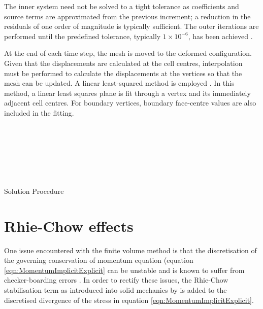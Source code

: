 \documentclass[sn-mathphys,Numbered,draft]{sn-jnl}%
\begin{document}
The inner system need not be solved to a tight tolerance
as coefficients and source terms are approximated from the previous increment; a reduction in the residuals of one order of magnitude is typically sufficient. The outer iterations are performed until the predefined tolerance, typically $1 \times 10^{-6}$, has been achieved \cite{cardiff_lagrangian_2017}. 

At the end of each time step, the mesh is moved to the deformed configuration. Given that the displacements are calculated at the cell centres, interpolation must be performed to calculate the displacements at the vertices so that the mesh can be updated. A linear least-squared method is employed \cite{cavalcante_generalized_2012}. In this method, a linear least squares plane is fit through a vertex and its immediately adjacent cell centres. For boundary vertices, boundary face-centre values are also included in the fitting.

 
\begin{algorithm}[H]
\SetAlgoLined
{} \\
\ \  
\ 
\ 
\  
\ \ 

\ \ 

\ \ 
 \caption{Solution Procedure}
\end{algorithm}





\section{Rhie-Chow effects}

One issue encountered with the finite volume method is that the discretisation of the governing conservation of momentum equation (equation \ref{eqn:MomentumImplicitExplicit} can be unstable and is known to suffer from checker-boarding errors \citet{cardiff_thirty_2021}. In order to rectify these issues, the Rhie-Chow stabilisation term \cite{rhie_numerical_1983} as introduced into solid mechanics by \citet{demirdzic_numerical_1995} is added to the discretised divergence of the stress in equation \ref{eqn:MomentumImplicitExplicit}.
\end{document}
